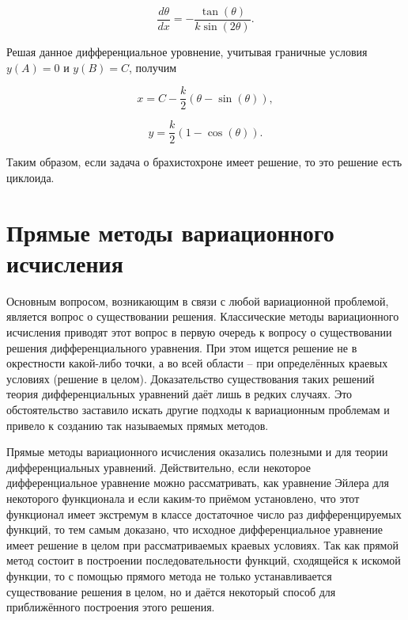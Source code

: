 \documentclass{article}
\begin{document}
\begin{displaymath}
	\frac{d \theta}{dx} = - \frac{\tan(\theta)}{k \sin(2\theta)}.
\end{displaymath}

\noindent Решая данное дифференциальное уровнение, учитывая граничные условия $y(A) = 0$ и $y(B) = C$, получим

\begin{displaymath}
	x = C - \frac{k}{2}(\theta - \sin(\theta)),
\end{displaymath}

\begin{displaymath}
	y = \frac{k}{2}(1 - \cos(\theta)).
\end{displaymath}

\noindent Таким образом, если задача о брахистохроне имеет решение, то это решение есть циклоида.


\newpage

\section{Прямые методы вариационного исчисления}

Основным вопросом, возникающим в связи с любой вариационной проблемой, является вопрос о существовании решения. 
Классические методы вариационного исчисления приводят этот вопрос в первую очередь к вопросу о существовании решения дифференциального уравнения. 
При этом ищется решение не в окрестности какой-либо точки, а во всей области -- при определённых краевых условиях (решение в целом). 
Доказательство существования таких решений теория дифференциальных уравнений даёт лишь в редких случаях. 
Это обстоятельство заставило искать другие подходы к вариационным проблемам и привело к созданию так называемых прямых методов.

Прямые методы вариационного исчисления оказались полезными и для теории дифференциальных уравнений. 
Действительно, если некоторое дифференциальное уравнение можно рассматривать, как уравнение Эйлера для некоторого функционала и если каким-то приёмом установлено, 
что этот функционал имеет экстремум в классе достаточное число раз дифференцируемых функций, 
то тем самым доказано, что исходное дифференциальное уравнение имеет решение в целом при рассматриваемых краевых условиях. 
Так как прямой метод состоит в построении последовательности функций, сходящейся к искомой функции, то с помощью прямого метода не только устанавливается существование решения в целом, 
но и даётся некоторый способ для приближённого построения этого решения.
\end{document}
